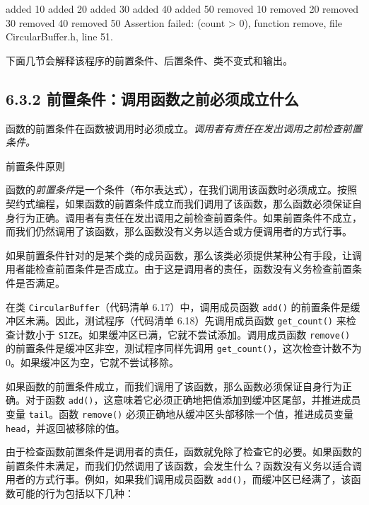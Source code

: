 \begin{codebox}
added 10
added 20
added 30
added 40
added 50
removed 10
removed 20
removed 30
removed 40
removed 50
Assertion failed: (count > 0), function remove, file CircularBuffer.h, line 51.
\end{codebox}

下面几节会解释该程序的前置条件、后置条件、类不变式和输出。

\subsection{6.3.2 前置条件：调用函数之前必须成立什么}

函数的前置条件在函数被调用时必须成立。\emph{调用者有责任在发出调用之前检查前置条件。}

\begin{mySidebar}{前置条件原则}

函数的\emph{前置条件}是一个条件（布尔表达式），在我们调用该函数时必须成立。按照契约式编程，如果函数的前置条件成立而我们调用了该函数，那么函数必须保证自身行为正确。调用者有责任在发出调用之前检查前置条件。如果前置条件不成立，而我们仍然调用了该函数，那么函数没有义务以适合或方便调用者的方式行事。

如果前置条件针对的是某个类的成员函数，那么该类必须提供某种公有手段，让调用者能检查前置条件是否成立。由于这是调用者的责任，函数没有义务检查前置条件是否满足。
\end{mySidebar}

在类 \texttt{Circular\allowbreak{}Buffer}（代码清单 6.17）中，调用成员函数 \texttt{add()} 的前置条件是缓冲区未满。因此，测试程序（代码清单 6.18）先调用成员函数 \texttt{get\_\allowbreak{}count(\allowbreak{})\allowbreak{}} 来检查计数小于 \texttt{SIZE}。如果缓冲区已满，它就不尝试添加。调用成员函数 \texttt{remove()} 的前置条件是缓冲区非空，测试程序同样先调用 \texttt{get\_\allowbreak{}count(\allowbreak{})\allowbreak{}}，这次检查计数不为 0。如果缓冲区为空，它就不尝试移除。

如果函数的前置条件成立，而我们调用了该函数，那么函数必须保证自身行为正确。对于函数 \texttt{add()}，这意味着它必须正确地把值添加到缓冲区尾部，并推进成员变量 \texttt{tail}。函数 \texttt{remove()} 必须正确地从缓冲区头部移除一个值，推进成员变量 \texttt{head}，并返回被移除的值。

由于检查函数前置条件是调用者的责任，函数就免除了检查它的必要。如果函数的前置条件未满足，而我们仍然调用了该函数，会发生什么？函数没有义务以适合调用者的方式行事。例如，如果我们调用成员函数 \texttt{add()}，而缓冲区已经满了，该函数可能的行为包括以下几种：

